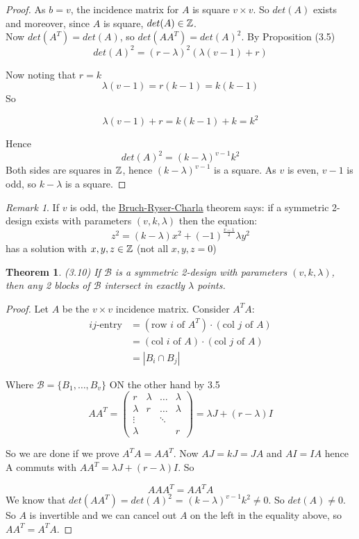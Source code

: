 \documentclass[]{article}
\newtheorem{thm}{Theorem}[section]
\theoremstyle{definition}
\theoremstyle{remark}
\newtheorem*{rem}{Remark}
\numberwithin{equation}{section}
\begin{document}
		\begin{proof}
			As $b = v$, the incidence matrix for $A$ is square $v \times v$. So $det(A)$ exists and moreover, since $A$ is square, $det(A) \in \mathbb{Z}$. \\

			Now $det(A^T) = det(A)$, so $det(AA^T) = det(A)^2$.
			By Proposition (3.5)
			\[
				det(A)^2 = (r - \lambda)^2(\lambda(v-1) + r)
			\]

			Now noting that $r = k$
			\[
				\lambda(v-1) = r(k-1) = k(k-1)
			\]
			So

			\[
				\lambda(v-1) + r = k(k-1) + k = k^2
			\]

			Hence 
			\[
				det(A)^2 = (k - \lambda)^{v-1}k^2
			\]
			Both sides are squares in $\mathbb{Z}$, hence $(k-\lambda)^{v-1}$ is a square. As $v$ is even, $v-1$ is odd, so $k-\lambda$ is a square.
		\end{proof}
					
		\begin{rem}
			If $v$ is odd, the \underline{Bruch-Ryser-Charla} theorem says: if a symmetric 2-design exists with parameters $(v, k, \lambda)$ then the equation:
			\[
				z^2 = (k-\lambda)x^2 + (-1)^{\frac{v-1}{2}}\lambda y^2
			\]
			has a solution with $x,y,z \in \mathbb{Z}$ (not all $x,y,z = 0$)
		\end{rem}					
		
		\begin{thm}(3.10)
			If $\mathcal{B}$ is a symmetric 2-design with parameters $(v,k, \lambda)$, then any 2 blocks of $\mathcal{B}$ intersect in exactly $\lambda$ points.
		\end{thm}

		\begin{proof}
			Let $A$ be the $v \times v$ incidence matrix. Consider $A^T A$:
			\begin{align*}
				\text{$ij$-entry} &= (\text{row $i$ of $A^T$}) \cdot (\text{col $j$ of $A$})\\
								  &= (\text{col $i$ of $A$}) \cdot (\text{col $j$ of $A$})\\
								  &= |B_i \cap B_j|
			\end{align*}

			Where $\mathcal{B} = \{B_1, \hdots, B_v\}$
			ON the other hand by 3.5
			\[
				AA^T = \begin{pmatrix}
				 		r & \lambda & \hdots & \lambda \\
				 		\lambda & r & \hdots & \lambda \\
				 		\vdots & & \ddots & \\
				 		\lambda & & & r
						\end{pmatrix} = \lambda J + (r-\lambda) I
			\]

			So we are done if we prove $A^T A = A A^T$.
			Now $AJ = kJ = JA$ and $AI = IA$ hence A commuts with $A A^T = \lambda J + (r - \lambda) I$. So

			\[AAA^T = A A^T A\]
			We know that $det(AA^T) = det(A)^2$ = $(k-\lambda)^{v-1}k^2 \neq 0$. So $det(A) \neq 0$. So $A$ is invertible and we can cancel out $A$ on the left in the equality above, so $AA ^T = A^T A$. 
		\end{proof}
\end{document}
